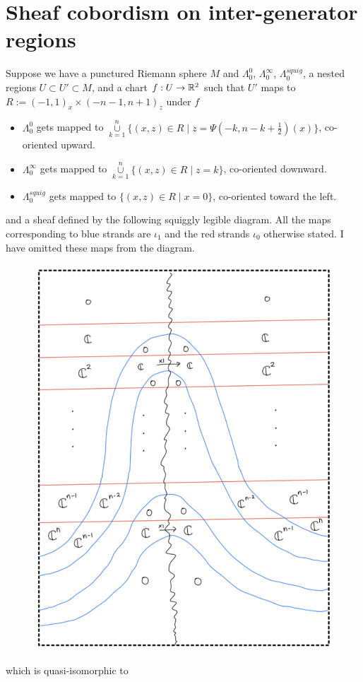 \section{Sheaf cobordism on inter-generator regions}
Suppose we have a punctured Riemann sphere $M$ and $\Lambda_0^0$, $\Lambda_0^\infty$, $\Lambda_0^{squig}$, a nested regions $U\subset U' \subset M$, and a chart $f : U \rightarrow \mathbb{R}^2$ such that $U'$ maps to $R:=(-1,1)_x \times (-n-1,n+1)_z$ under $f$
\begin{itemize}
\item $\Lambda_0^0$ gets mapped to $\overset{n}{\underset{k=1}{\cup}}\{(x,z)\in R \mid z=\Psi(-k,n-k+\frac{1}{2})(x)\}$, co-oriented upward.

\item $\Lambda_0^\infty$ gets mapped to $\overset{n}{\underset{k=1}{\cup}}\{(x,z)\in R \mid z=k\}$, co-oriented downward.

\item $\Lambda_0^{squig}$ gets mapped to $\{(x,z)\in R \mid x=0\}$, co-oriented toward the left.
\end{itemize}
and a sheaf defined by the following squiggly legible diagram. All the maps corresponding to blue strands are $\iota_1$ and the red strands $\iota_0$ otherwise stated. I have omitted these maps from the diagram.\\

\begin{figure}[H]
    \centering
    \includegraphics[scale = 0.95]{diagrams/cobord_inter/0.png}
    \caption{}
    \label{fig:your-label}
\end{figure}
\pagebreak
which is quasi-isomorphic to

